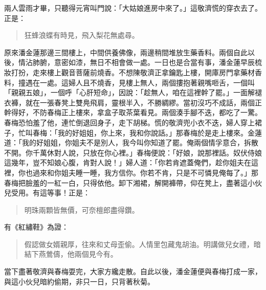 兩人雲雨才畢，只聽得元宵叫門說：「大姑娘進房中來了。」這敬濟慌的穿衣去了。正是：
\begin{quote}
狂蜂浪蝶有時見，飛入梨花無處尋。
\end{quote}

原來潘金蓮那邊三間樓上，中間供養佛像，兩邊稍間堆放生藥香料。兩個自此以後，情沾肺腑，意密如漆，無日不相會做一處。一日也是合當有事，潘金蓮早辰梳妝打扮，走來樓上觀音菩薩前燒香。不想陳敬濟正拿鑰匙上樓，開庫房門拿藥材香料，撞遇在一處。這婦人且不燒香，見樓上無人，兩個摟抱著親嘴咂舌，一個叫「親親五娘」，一個呼「心肝短命」，因說：「趁無人，咱在這裡幹了罷。」一面解褪衣褲，就在一張春凳上雙鳧飛肩，靈根半入，不勝綢繆。當初沒巧不成話，兩個正幹得好，不防春梅正上樓來，拿盒子取茶葉看見。兩個湊手腳不迭，都吃了一驚。春梅恐怕羞了他，連忙倒退回身子，走下胡梯。慌的敬濟兜小衣不迭，婦人穿上裙子，忙叫春梅：「我的好姐姐，你上來，我和你說話。」那春梅於是走上樓來。金蓮道：「我的好姐姐，你姐夫不是別人，我今叫你知道了罷。俺兩個情孚意合，拆散不開。你千萬休對人說，只放在你心裡。」春梅便說：「好娘，說那裡話。奴伏侍娘這幾年，豈不知娘心腹，肯對人說！」婦人道：「你若肯遮蓋俺們，趁你姐夫在這裡，你也過來和你姐夫睡一睡，我方信你。你若不肯，只是不可憐見俺每了。」那春梅把臉羞的一紅一白，只得依他。卸下湘裙，解開褲帶，仰在凳上，盡著這小伙兒受用。有這等事！正是：
\begin{quote}
明珠兩顆皆無價，可奈檀郎盡得鑽。
\end{quote}
有《紅繡鞋》為證：
\begin{quote}
假認做女婿親厚，往來和丈母歪偷。人情里包藏鬼胡油。明講做兒女禮，暗結下燕鶯儔，他兩個見今有。
\end{quote}

當下盡著敬濟與春梅耍完，大家方纔走散。自此以後，潘金蓮便與春梅打成一家，與這小伙兒暗約偷期，非只一日，只背著秋菊。

